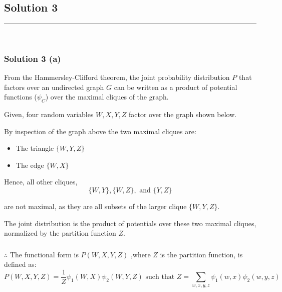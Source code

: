 \documentclass{article}
\begin{document}
\subsection*{Solution 3}
\noindent\rule{\textwidth}{0.4pt}\\
\subsubsection*{Solution 3 (a)}
From the Hammersley-Clifford theorem, the joint probability distribution $P$ that factors over an undirected graph $G$ can be written as a product of potential functions ($\psi_C$) over the maximal cliques of the graph.
\begin{flushleft}
    Given, four random variables $W, X, Y, Z$ factor over the graph shown below.
\end{flushleft}
\begin{center}
\end{center}
By inspection of the graph above the two maximal cliques are:
\begin{itemize}
    \item The triangle $\{W, Y, Z\}$
    \item The edge $\{W, X\}$
\end{itemize}
Hence, all other cliques, 
$$\{W, Y\}, \{W, Z\}, \text{ and } \{Y, Z\}$$
\begin{flushleft}
    are not maximal, as they are all subsets of the larger clique $\{W, Y, Z\}$.
\end{flushleft}


The joint distribution is the product of potentials over these two maximal cliques, normalized by the partition function $Z$.

\subsubsection*{\normalfont}{$\therefore$ The functional form is $P(W, X, Y, Z)$ ,where $Z$ is the partition function, is defined as:}
$$
P(W, X, Y, Z) = \frac{1}{Z} \psi_1(W, X) \psi_2(W, Y, Z) \text{ such that } Z = \sum_{w,x,y,z} \psi_1(w, x) \psi_2(w, y, z)
$$
\end{document}

